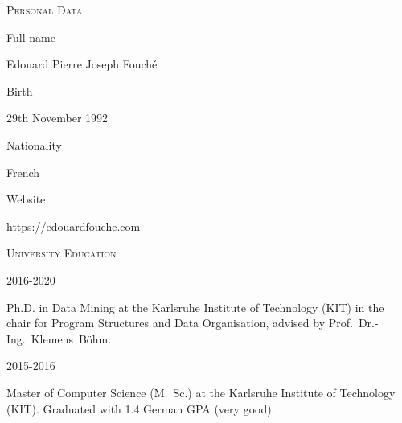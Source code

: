 
\newcommand{\hintfont}{}

\newlength{\hintscolumnwidth}
\setlength{\hintscolumnwidth}{0.14\textwidth}

\newlength{\separatorcolumnwidth}
\setlength{\separatorcolumnwidth}{0.04\textwidth}

\newlength{\maincolumnwidth}
\setlength{\maincolumnwidth}{\textwidth}
\addtolength{\maincolumnwidth}{-10pt}
\addtolength{\maincolumnwidth}{-\separatorcolumnwidth}
\addtolength{\maincolumnwidth}{-\hintscolumnwidth}

\newcommand*{\cvsection}[1]{%
	\vspace{2.5ex plus 1ex minus 1.2ex}%
	\parbox[m]{\maincolumnwidth}{\large\scshape{#1}}%
	\vspace{0.5ex plus 1ex minus .2ex}%
}

\newcommand*{\cvline}[2]{%
	\parbox[t]{\hintscolumnwidth}{\raggedleft{}\hintfont{}#1}%
	\hspace{\separatorcolumnwidth}%
	\parbox[t]{\maincolumnwidth}{#2}%
}

\newcommand*{\cvlinex}[2]{%
	\parbox[t]{\hintscolumnwidth}{\raggedleft{}#1}%
	\hspace{\separatorcolumnwidth}%
	\parbox[t]{\maincolumnwidth}{\raggedright{}#2}%
}

\newcommand*{\cvfullline}[1]{%
	\parbox[t]{.5\hintscolumnwidth}{\raggedleft{}\hintfont{}~}%
	\hspace{\separatorcolumnwidth}%
	\parbox[t]{\maincolumnwidth}{\raggedright{}#1}%
}

\noindent\cvsection{Personal Data}

\noindent\cvline{Full name}{Edouard Pierre Joseph Fouché}

\noindent\cvline{Birth}{29th November 1992}

\noindent\cvline{Nationality}{French}

\noindent\cvline{Website}{\url{https://edouardfouche.com}}

\vspace{2ex}
\noindent \cvsection{University Education}

\noindent\cvline{2016-2020}{Ph.D. in Data Mining at the Karlsruhe Institute of Technology (KIT) in the chair for Program Structures and Data Organisation, advised by Prof.~Dr.-Ing.~Klemens~B{\"o}hm.
	\vskip4pt
}

\noindent\cvline{2015-2016}{Master of Computer Science (M.~Sc.) at the Karlsruhe Institute of Technology (KIT). Graduated with 1.4 German GPA (very good).
	\vskip4pt
}

